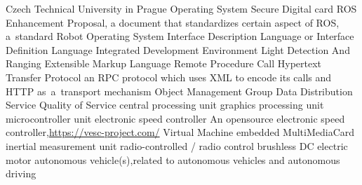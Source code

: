      {Czech Technical University in Prague}
      {Operating System}
 {Secure Digital card}
     {ROS Enhancement Proposal, a document that standardizes certain aspect of ROS, a~standard}
     {Robot Operating System}
     {Interface Description Language or Interface Definition Language}
     {Integrated Development Environment}
   {Light Detection And Ranging}
     {Extensible Markup Language}
     {Remote Procedure Call}
    {Hypertext Transfer Protocol}
 {an RPC protocol which uses XML to encode its calls and HTTP as~a~transport mechanism}
     {Object Management Group}
     {Data Distribution Service}
     {Quality of Service}
     {central processing unit}
     {graphics processing unit}
     {microcontroller unit}
     {electronic speed controller}
    {An opensource electronic speed controller,\nl\url{https://vesc-project.com/}}
      {Virtual Machine}
    {embedded MultiMediaCard}
     {inertial measurement unit}
      {radio-controlled / radio control}
    {brushless DC electric motor}
      {autonomous vehicle(s),\nl related to autonomous vehicles and autonomous driving}
